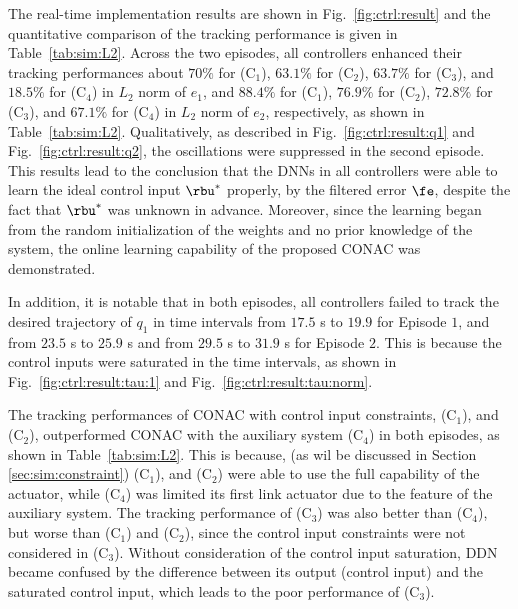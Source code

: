 \documentclass[lettersize,journal]{IEEEtran}
\begin{document}
The real-time implementation results are shown in Fig.~\ref{fig:ctrl:result} and the quantitative comparison of the tracking performance is given in Table~\ref{tab:sim:L2}.
Across the two episodes, all controllers enhanced their tracking performances about $70 \%$ for (C$_1$), $63.1 \%$ for (C$_2$), $63.7 \%$ for (C$_3$), and $18.5 \%$ for (C$_4$) in $L_2$ norm of $e_1$, and $88.4 \%$ for (C$_1$), $76.9 \%$ for (C$_2$), $72.8 \%$ for (C$_3$), and $67.1 \%$ for (C$_4$) in $L_2$ norm of $e_2$, respectively, as shown in Table~\ref{tab:sim:L2}.
Qualitatively, as described in Fig.~\ref{fig:ctrl:result:q1} and Fig.~\ref{fig:ctrl:result:q2}, the oscillations were suppressed in the second episode.
This results lead to the conclusion that the DNNs in all controllers were able to learn the ideal control input $\rbu^*$ properly, by the filtered error $\fe$, despite the fact that $\rbu^*$ was unknown in advance.
Moreover, since the learning began from the random initialization of the weights and no prior knowledge of the system, the online learning capability of the proposed CONAC was demonstrated.

In addition, it is notable that in both episodes, all controllers failed to track the desired trajectory of $q_1$ in time intervals from $17.5$ s to $19.9$ for Episode $1$, and from $23.5$ s to $25.9$ s and from $29.5$ s to $31.9$ s for Episode $2$.
This is because the control inputs were saturated in the time intervals, as shown in Fig.~\ref{fig:ctrl:result:tau:1} and Fig.~\ref{fig:ctrl:result:tau:norm}.

The tracking performances of CONAC with control input constraints, \ie (C$_1$), and (C$_2$), outperformed CONAC with the auxiliary system (C$_4$) in both episodes, as shown in Table~\ref{tab:sim:L2}.
This is because, (as wil be discussed in Section \ref{sec:sim:constraint}) (C$_1$), and (C$_2$) were able to use the full capability of the actuator, while (C$_4$) was limited its first link actuator due to the feature of the auxiliary system.
The tracking performance of (C$_3$) was also better than (C$_4$), but worse than (C$_1$) and (C$_2$), since the control input constraints were not considered in (C$_3$).
Without consideration of the control input saturation, DDN became confused by the difference between its output (control input) and the saturated control input, which leads to the poor performance of (C$_3$).
\end{document}
